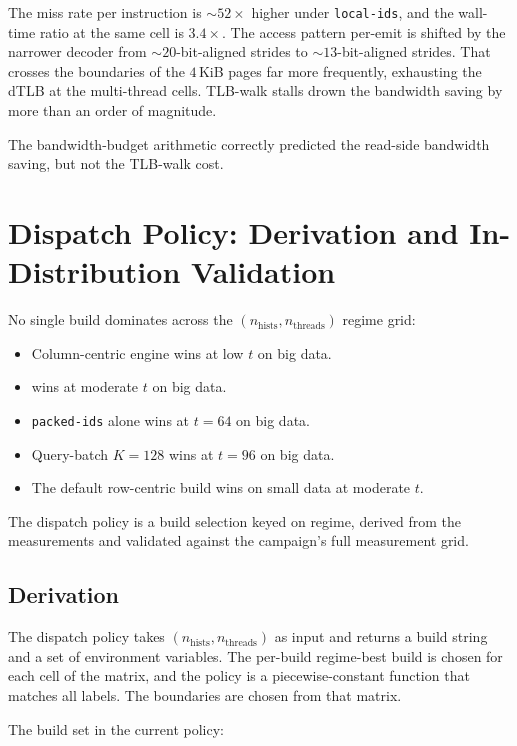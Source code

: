 The miss rate per instruction is $\sim\!52\times$ higher under \texttt{local-ids}, and the wall-time ratio at the same cell is $3.4\times$.  The access pattern per-emit is shifted by the narrower decoder from ${\sim}20$-bit-aligned strides to ${\sim}13$-bit-aligned strides. That crosses the boundaries of the $4$\,KiB pages far more frequently, exhausting the dTLB at the multi-thread cells. TLB-walk stalls drown the bandwidth saving by more than an order of magnitude.

The bandwidth-budget arithmetic correctly predicted the read-side bandwidth saving, but not the TLB-walk cost.

\section{Dispatch Policy: Derivation and In-Distribution Validation\label{sec:exp:dispatch}}



No single build dominates across the $(n_\text{hists}, n_\text{threads})$ regime grid:

\begin{itemize}
  \item Column-centric engine wins at low $t$ on big data.
  \item \bcombo{} wins at moderate $t$ on big data.
  \item \texttt{packed-ids} alone wins at $t{=}64$ on big data.
  \item Query-batch $K{=}128$ wins at $t{=}96$ on big data.
  \item The default row-centric build wins on small data at moderate $t$.
\end{itemize}

The dispatch policy is a build selection keyed on regime, derived from the measurements and validated against the campaign's full measurement grid.

\subsection{Derivation\label{sec:exp:dispatch:derive}}

 The dispatch policy takes $(n_\text{hists}, n_\text{threads})$ as input and returns a build string and a set of environment variables. The per-build regime-best build is chosen for each cell of the matrix, and the policy is a piecewise-constant function that matches all labels. The boundaries are chosen from that matrix.

The build set in the current policy:

